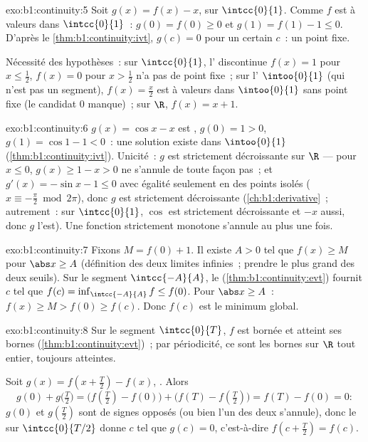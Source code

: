 \begin{solution}{exo:b1:continuity:5}
Soit $g(x) = f(x) - x$,  sur $\intcc{0}{1}$. Comme $f$ est à
valeurs dans $\intcc{0}{1}$~: $g(0) = f(0) \geq 0$ et $g(1) = f(1) - 1
\leq 0$. D'après le \cref{thm:b1:continuity:ivt}, $g(c) = 0$ pour un
certain $c$~: un point fixe.

Nécessité des hypothèses~: sur $\intcc{0}{1}$, l'
discontinue $f(x) = 1$ pour $x \leq \frac12$, $f(x) = 0$ pour $x >
\frac12$ n'a pas de point fixe~; sur l' $\intoo{0}{1}$ (qui
n'est pas un segment), $f(x) = \frac x2$ est  à valeurs dans
$\intoo{0}{1}$ sans point fixe (le candidat $0$ manque)~; sur $\R$,
$f(x) = x + 1$.
\end{solution}

\begin{solution}{exo:b1:continuity:6}
$g(x) = \cos x - x$ est , $g(0) = 1 > 0$, $g(1) = \cos 1 -
1 < 0$~: une solution existe dans $\intoo{0}{1}$
(\cref{thm:b1:continuity:ivt}). Unicité~: $g$ est strictement
décroissante sur $\R$ --- pour $x \leq 0$, $g(x) \geq 1 - x > 0$ ne
s'annule de toute façon pas~; et $g'(x) = -\sin x - 1 \leq 0$ avec
égalité seulement en des points isolés ($x \equiv -\frac\pi2 \bmod
2\pi$), donc $g$ est strictement décroissante (\cref{ch:b1:derivative}~;
autrement~: sur $\intcc{0}{1}$, $\cos$ est strictement décroissante et
$-x$ aussi, donc $g$ l'est). Une fonction strictement monotone s'annule
au plus une fois.
\end{solution}

\begin{solution}{exo:b1:continuity:7}
Fixons $M = f(0) + 1$. Il existe $A > 0$ tel que $f(x) \geq M$ pour
$\abs x \geq A$ (définition des deux limites infinies~; prendre le plus
grand des deux seuils). Sur le segment $\intcc{-A}{A}$, le  (\cref{thm:b1:continuity:evt}) fournit $c$ tel que
$f(c) = \inf_{\intcc{-A}{A}} f \leq f(0)$. Pour $\abs x \geq A$~: $f(x)
\geq M > f(0) \geq f(c)$. Donc $f(c)$ est le minimum global.
\end{solution}

\begin{solution}{exo:b1:continuity:8}
Sur le segment $\intcc{0}{T}$, $f$ est bornée et atteint ses bornes
(\cref{thm:b1:continuity:evt})~; par périodicité, ce sont les bornes
sur $\R$ tout entier, toujours atteintes.

Soit $g(x) = f(x + \frac T2) - f(x)$, . Alors
\[
g(0) + g\bigl(\tfrac T2\bigr)
= \bigl(f(\tfrac T2) - f(0)\bigr) + \bigl(f(T) - f(\tfrac T2)\bigr)
= f(T) - f(0) = 0 :
\]
$g(0)$ et $g(\frac T2)$ sont de signes opposés (ou bien l'un des deux
s'annule), donc le  sur
$\intcc{0}{T/2}$ donne $c$ tel que $g(c) = 0$, c'est-à-dire $f(c +
\frac T2) = f(c)$.
\end{solution}

